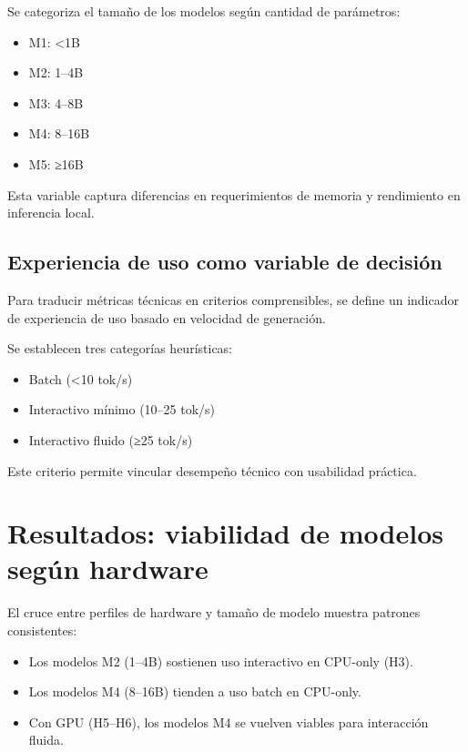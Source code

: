 \documentclass{llncs}
\begin{document}
Se categoriza el tamaño de los modelos según cantidad de parámetros:

\begin{itemize}
    \item M1: \textless1B
    \item M2: 1–4B
    \item M3: 4–8B
    \item M4: 8–16B
    \item M5: ≥16B
\end{itemize}

Esta variable captura diferencias en requerimientos de memoria y rendimiento en inferencia local.

\subsection{Experiencia de uso como variable de decisión}\label{experiencia}

Para traducir métricas técnicas en criterios comprensibles, se define un indicador de experiencia de uso basado en velocidad de generación.

Se establecen tres categorías heurísticas:
\begin{itemize}
    \item Batch (\textless10 tok/s)
    \item Interactivo mínimo (10–25 tok/s)
    \item Interactivo fluido (≥25 tok/s)
\end{itemize}

Este criterio permite vincular desempeño técnico con usabilidad práctica.

\section{Resultados: viabilidad de modelos según hardware}\label{resultados-cuantitativos}

El cruce entre perfiles de hardware y tamaño de modelo muestra patrones consistentes:

\begin{itemize}
    \item Los modelos M2 (1–4B) sostienen uso interactivo en CPU-only (H3).
    \item Los modelos M4 (8–16B) tienden a uso batch en CPU-only.
    \item Con GPU (H5–H6), los modelos M4 se vuelven viables para interacción fluida.
\end{itemize}
\end{document}
